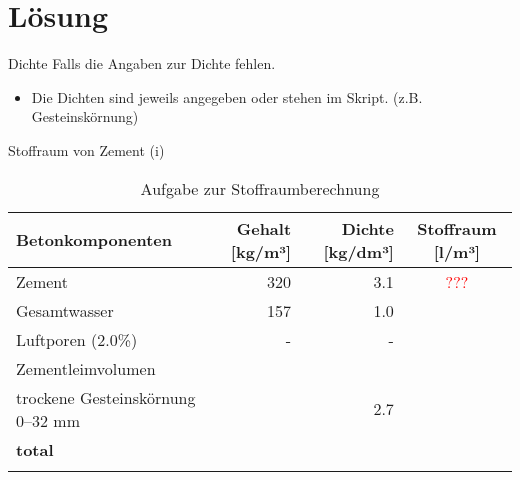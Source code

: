 \section{Lösung}
\BlueSectionSlide

\begin{frame}{Dichte}
    Falls die Angaben zur Dichte fehlen.
    \begin{itemize}
        \item Die Dichten sind jeweils angegeben oder stehen im Skript. (z.B. Gesteinskörnung)
    \end{itemize}
\end{frame}

\begin{frame}{Stoffraum von Zement (i)}
    \begin{table}[h]
        \centering
        \caption{Aufgabe zur Stoffraumberechnung}
        \small
        \begin{tabular}{lrrc}
        \toprule
        \textbf{Betonkomponenten}       & \textbf{Gehalt [kg/m³]} & \textbf{Dichte [kg/dm³]} & \textbf{Stoffraum [l/m³]} \\ 
        \midrule
        Zement                           & 320                      & 3.1                       &    \textcolor{red}{???}          \\
        Gesamtwasser                     & 157                      & 1.0                       & {}            \\
        Luftporen (2.0\%)                & -                        & -                         & {}              \\
        Zementleimvolumen                &                          &                           &                           \\
        trockene Gesteinskörnung 0–32 mm & {}                    & 2.7                       & {}             \\
        \textbf{total}                   & {}            &                           & {}             \\
        \bottomrule
        \label{tab:Stoffraumberechnung}
        \end{tabular}
        \end{table}

\end{frame}

